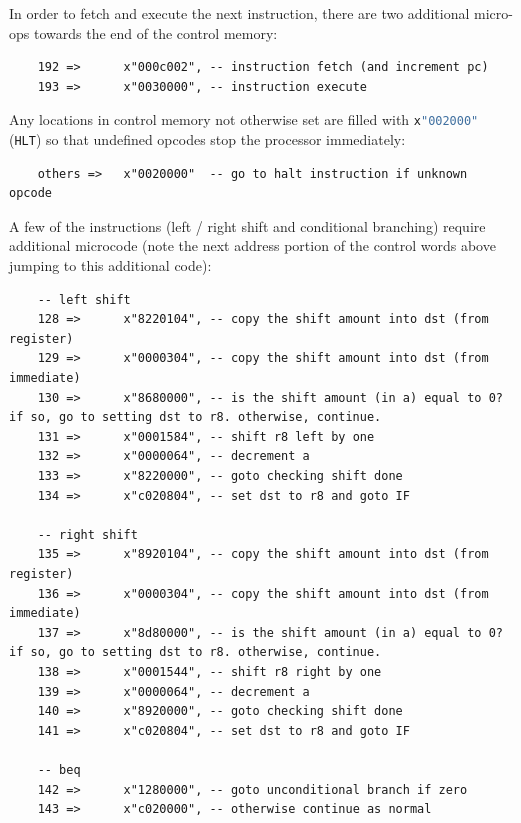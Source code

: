\documentclass[a4paper]{article}
\numberwithin{figure}{section}
\numberwithin{table}{section}
\newcommand{\mi}{\mintinline}
\begin{document}
\smallskip
In order to fetch and execute the next instruction, there are two additional micro-ops towards the end of the 
control memory:

\begin{verbatim}
	192 =>		x"000c002", -- instruction fetch (and increment pc)
	193 =>		x"0030000", -- instruction execute
\end{verbatim}

\smallskip
Any locations in control memory not otherwise set are filled with \mi{vhdl}{x"002000"} (\mi{c}{HLT}) so that undefined opcodes stop the processor immediately:
\begin{verbatim}
	others =>	x"0020000"  -- go to halt instruction if unknown opcode
\end{verbatim}

\newpage
\smallskip
A few of the instructions (left / right shift and conditional branching) require additional microcode (note the next address portion of the control words above jumping to this additional code):
\begin{listing}[ht]
\begin{verbatim}
	-- left shift
	128 =>		x"8220104", -- copy the shift amount into dst (from register)
	129 =>		x"0000304", -- copy the shift amount into dst (from immediate)
	130 =>		x"8680000", -- is the shift amount (in a) equal to 0? if so, go to setting dst to r8. otherwise, continue.
	131 =>		x"0001584", -- shift r8 left by one
	132 =>		x"0000064", -- decrement a
	133 =>		x"8220000", -- goto checking shift done
	134 =>		x"c020804", -- set dst to r8 and goto IF

	-- right shift
	135 =>		x"8920104", -- copy the shift amount into dst (from register)
	136 =>		x"0000304", -- copy the shift amount into dst (from immediate)
	137 =>		x"8d80000", -- is the shift amount (in a) equal to 0? if so, go to setting dst to r8. otherwise, continue.
	138 =>		x"0001544", -- shift r8 right by one
	139 =>		x"0000064", -- decrement a
	140 =>		x"8920000", -- goto checking shift done
	141 =>		x"c020804", -- set dst to r8 and goto IF

	-- beq
	142 =>		x"1280000", -- goto unconditional branch if zero
	143 =>		x"c020000", -- otherwise continue as normal
\end{verbatim}
\label{label:extramc}
\end{listing}


\newpage
\end{document}
